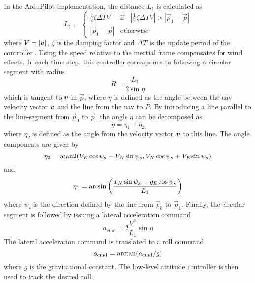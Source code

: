 In the ArduPilot implementation, the distance $L_1$ is calculated as
\begin{equation}\label{eq:ardu_l1}
    L_1=\begin{cases}
        \frac{1}{\pi}\zeta\Delta TV & \mbox{if}\quad |\frac{1}{\pi}\zeta\Delta TV|>|\vec{p}_1-\vec{p}| \\
        |\vec{p}_1-\vec{p}| & \mbox{otherwise}
    \end{cases}
\end{equation}
where $V=|\boldsymbol{v}|$, $\zeta$ is the damping factor and $\Delta T$ is the update period of the controller \cite{arduplane_l1}.
Using the speed relative to the inertial frame compensates for wind effects. In each time step, this controller corresponds to following a circular segment with radius
 \begin{equation}
    R=\frac{L_1}{2\sin\eta}
 \end{equation}
 which is tangent to $\boldsymbol{v}$ in $\vec{p}$, where
 $\eta$ is defined as the angle between the \ac{uav} velocity vector $\boldsymbol{v}$ and the line from the \ac{uav} to $P$. By introducing a line parallel to the line-segment from $\vec{p}_0$ to $\vec{p}_1$ the angle $\eta$ can be decomposed as
\begin{equation}\label{eq:eta_first}
    \eta=\eta_1+\eta_2
\end{equation}
where $\eta_2$ is defined as the angle from the velocity vector $\boldsymbol{v}$ to this line.
The angle components are given by 
\begin{equation}
    \eta_2=\atan2(V_E\cos\psi_s - V_N\sin\psi_s,V_N\cos\psi_s+V_E\sin\psi_s)
\end{equation}
and 
\begin{equation}\label{eq:eta_last}
    \eta_1=\operatorname*{arcsin}\left(\frac{x_N\sin\psi_s-y_E\cos\psi_s}{L_1}\right)
\end{equation}
where $\psi_s$ is the direction defined by the line from $\vec{p}_0$ to $\vec{p}_1$.
Finally, the circular segment is followed by issuing a lateral acceleration command
\begin{equation}\label{eq:lat_acc}
    a_{\text{cmd}}=2\frac{V^2}{L_1}\sin\eta
\end{equation}
The lateral acceleration command is translated to a roll command
\begin{equation}\label{eq:roll_cmd}
    \phi_{\text{cmd}}=\operatorname*{arctan}(a_{\text{cmd}}/g)
\end{equation}
where $g$ is the gravitational constant. The low-level attitude controller is then used to track the desired roll.

